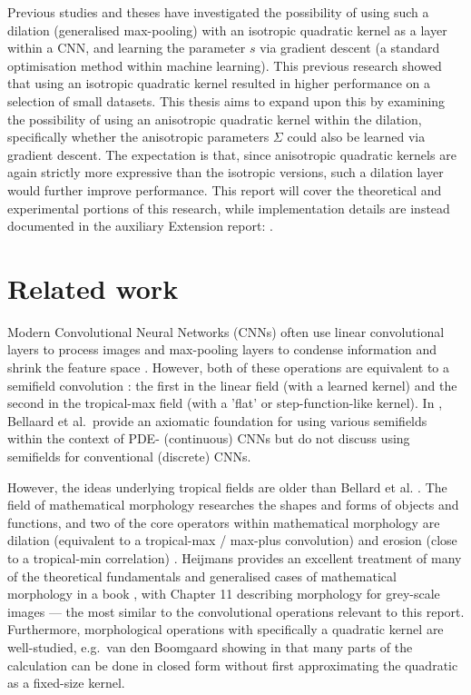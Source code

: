 \documentclass[a4paper, 12pt]{report}
\begin{document}
Previous studies \cite{groenendijk2022morphpool} and theses \cite{thierrybsc, koenbsc} have investigated the possibility of using such a dilation (generalised max-pooling) with an isotropic quadratic kernel as a layer within a CNN, and learning the parameter $s$ via gradient descent (a standard optimisation method within machine learning). This previous research showed that using an isotropic quadratic kernel resulted in higher performance on a selection of small datasets. This thesis aims to expand upon this by examining the possibility of using an anisotropic quadratic kernel within the dilation, specifically whether the anisotropic parameters $\Sigma$ could also be learned via gradient descent. The expectation is that, since anisotropic quadratic kernels are again strictly more expressive than the isotropic versions, such a dilation layer would further improve performance. This report will cover the theoretical and experimental portions of this research, while implementation details are instead documented in the auxiliary Extension report: \cite{extension}.

\newpage
\section{Related work}
Modern Convolutional Neural Networks (CNNs) often use linear convolutional layers to process images and max-pooling layers to condense information and shrink the feature space \cite{introconvnets}. However, both of these operations are equivalent to a semifield convolution \cite{bellaardaxiomatic}: the first in the linear field (with a learned kernel) and the second in the tropical-max field (with a 'flat' or step-function-like kernel). In \cite{bellaardaxiomatic}, Bellaard et al.\ provide an axiomatic foundation for using various semifields within the context of PDE- (continuous) CNNs but do not discuss using semifields for conventional (discrete) CNNs. 

However, the ideas underlying tropical fields are older than Bellard et al. \cite{bellaardaxiomatic}. The field of mathematical morphology researches the shapes and forms of objects and functions, and two of the core operators within mathematical morphology are dilation (equivalent to a tropical-max / max-plus convolution) and erosion (close to a tropical-min correlation) \cite{maragos}. Heijmans provides an excellent treatment of many of the theoretical fundamentals and generalised cases of mathematical morphology in a book \cite{heijmans1996morphological}, with Chapter 11 describing morphology for grey-scale images --- the most similar to the convolutional operations relevant to this report. Furthermore, morphological operations with specifically a quadratic kernel are well-studied, e.g.\ van den Boomgaard showing in \cite{Boomgaard1999NumericalSS} that many parts of the calculation can be done in closed form without first approximating the quadratic as a fixed-size kernel.
\end{document}
